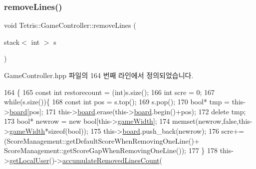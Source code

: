 \subsubsection{\texorpdfstring{remove\+Lines()}{removeLines()}\hspace{0.1cm}{\footnotesize\ttfamily [2/2]}}
{\footnotesize\ttfamily void Tetris\+::\+Game\+Controller\+::remove\+Lines (\begin{DoxyParamCaption}\item[{stack$<$ int $>$}]{s }\end{DoxyParamCaption})\hspace{0.3cm}{\ttfamily [inline]}}



Game\+Controller.\+hpp 파일의 164 번째 라인에서 정의되었습니다.


\begin{DoxyCode}
164                                           \{
165                 \textcolor{keyword}{const} \textcolor{keywordtype}{int} restorecount = (int)s.size();
166                 \textcolor{keywordtype}{int} scre = 0;
167                 \textcolor{keywordflow}{while}(s.size())\{
168                     \textcolor{keyword}{const} \textcolor{keywordtype}{int} pos = s.top();
169                     s.pop();
170                     \textcolor{keywordtype}{bool}* tmp = this->\hyperlink{class_tetris_1_1_game_controller_a7725b6cec9459a6bffaa3e29dd1c5196}{board}[pos];
171                     this->\hyperlink{class_tetris_1_1_game_controller_a7725b6cec9459a6bffaa3e29dd1c5196}{board}.erase(this->\hyperlink{class_tetris_1_1_game_controller_a7725b6cec9459a6bffaa3e29dd1c5196}{board}.begin()+pos);
172                     \textcolor{keyword}{delete} tmp;
173                     \textcolor{keywordtype}{bool}* newrow = \textcolor{keyword}{new} \textcolor{keywordtype}{bool}[this->\hyperlink{class_tetris_1_1_game_controller_a439f215918db4127fcb44cf9d501ed63}{gameWidth}];
174                     memset(newrow,\textcolor{keyword}{false},this->\hyperlink{class_tetris_1_1_game_controller_a439f215918db4127fcb44cf9d501ed63}{gameWidth}*\textcolor{keyword}{sizeof}(\textcolor{keywordtype}{bool}));
175                     this->\hyperlink{class_tetris_1_1_game_controller_a7725b6cec9459a6bffaa3e29dd1c5196}{board}.push\_back(newrow);
176                     scre+= (ScoreManagement::getDefaultScoreWhenRemovingOneLine()+ 
      ScoreManagement::getScoreGapWhenRemovingOneLine());
177                 \}
178                 this->\hyperlink{class_tetris_1_1_game_controller_abc67d4b309ce2886b43a3b4e0af22abc}{getLocalUser}()->\hyperlink{class_tetris_1_1_users_1_1_game_user_a89c6053fbb03b4fbfcd3fec883a87765}{accumulateRemovedLinesCount}(

\end{DoxyCode}
